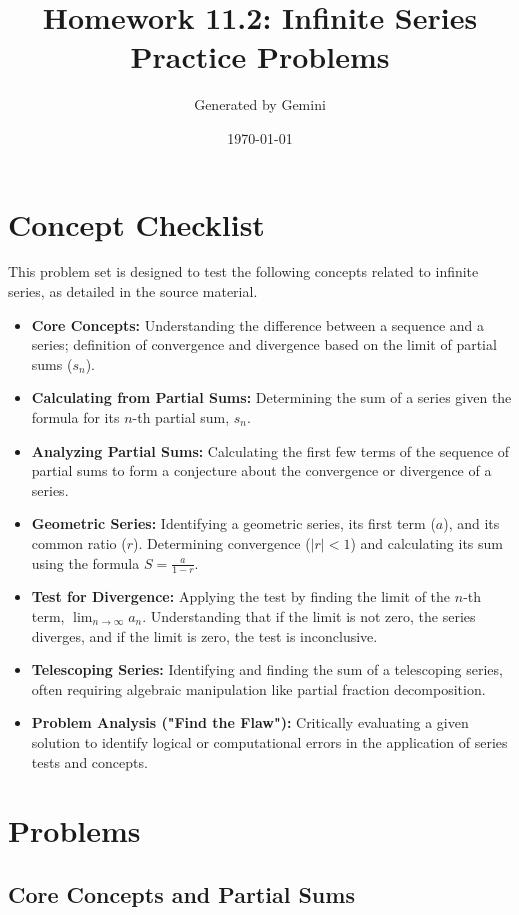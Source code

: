 \documentclass[12pt]{article}
\title{Homework 11.2: Infinite Series Practice Problems}
\author{Generated by Gemini}
\date{\today}
\begin{document}
\maketitle

\section*{Concept Checklist}
This problem set is designed to test the following concepts related to infinite series, as detailed in the source material.
\begin{itemize}
    \item \textbf{Core Concepts:} Understanding the difference between a sequence and a series; definition of convergence and divergence based on the limit of partial sums ($s_n$).
    \item \textbf{Calculating from Partial Sums:} Determining the sum of a series given the formula for its $n$-th partial sum, $s_n$.
    \item \textbf{Analyzing Partial Sums:} Calculating the first few terms of the sequence of partial sums to form a conjecture about the convergence or divergence of a series.
    \item \textbf{Geometric Series:} Identifying a geometric series, its first term ($a$), and its common ratio ($r$). Determining convergence ($|r| < 1$) and calculating its sum using the formula $S = \frac{a}{1-r}$.
    \item \textbf{Test for Divergence:} Applying the test by finding the limit of the $n$-th term, $\lim_{n\to\infty} a_n$. Understanding that if the limit is not zero, the series diverges, and if the limit is zero, the test is inconclusive.
    \item \textbf{Telescoping Series:} Identifying and finding the sum of a telescoping series, often requiring algebraic manipulation like partial fraction decomposition.
    \item \textbf{Problem Analysis ("Find the Flaw"):} Critically evaluating a given solution to identify logical or computational errors in the application of series tests and concepts.
\end{itemize}

\section{Problems}

\subsection{Core Concepts and Partial Sums}
\end{document}
